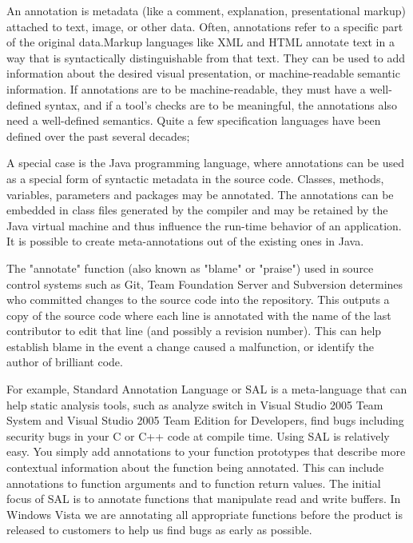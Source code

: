 An annotation is metadata (like a comment, explanation, presentational markup) attached to text, image, or other data. Often, annotations refer to a specific part of the original data.Markup languages like XML and HTML annotate text in a way that is syntactically distinguishable from that text. They can be used to add information about the desired visual presentation, or machine-readable semantic information. If annotations are to be machine-readable, they must have a well-defined syntax, and if a tool's checks are to be meaningful, the annotations also need a well-defined semantics. Quite a few specification languages have been defined over the past several decades; 

A special case is the Java programming language, where annotations can be used as a special form of syntactic metadata in the source code. Classes, methods, variables, parameters and packages may be annotated. The annotations can be embedded in class files generated by the compiler and may be retained by the Java virtual machine and thus influence the run-time behavior of an application. It is possible to create meta-annotations out of the existing ones in Java.

The "annotate" function (also known as "blame" or "praise") used in source control systems such as Git, Team Foundation Server and Subversion determines who committed changes to the source code into the repository. This outputs a copy of the source code where each line is annotated with the name of the last contributor to edit that line (and possibly a revision number). This can help establish blame in the event a change caused a malfunction, or identify the author of brilliant code.

For example, Standard Annotation Language or SAL \cite{ref_51_microsoft:sal} is a meta-language that can help static analysis tools, such as analyze switch in Visual Studio 2005 Team System and Visual Studio 2005 Team Edition for Developers, find bugs including security bugs in your C or C++ code at compile time.
Using SAL is relatively easy. You simply add annotations to your function prototypes that describe more contextual information about the function being annotated. This can include annotations to function arguments and to function return values. The initial focus of SAL is to annotate functions that manipulate read and write buffers. In Windows Vista we are annotating all appropriate functions before the product is released to customers to help us find bugs as early as possible.

